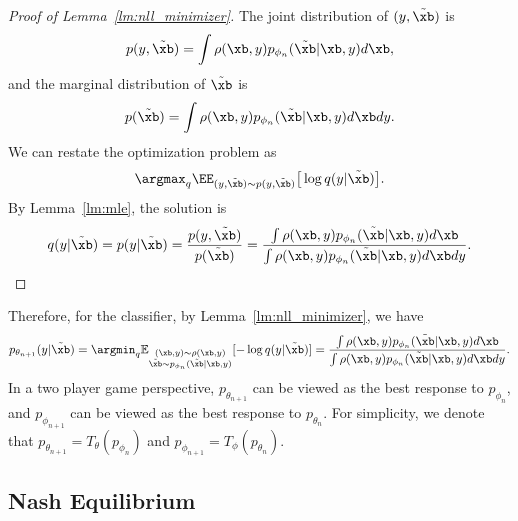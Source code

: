 \begin{proof}[Proof of Lemma~\ref{lm:nll_minimizer}]
    The joint distribution of $(y,\tilde{\xb})$ is 
    \begin{align*}
        p(y,\tilde{\xb}) = \int \rho(\xb, y)  p_{\phi_n}(\tilde{\xb} | \xb, y) d\xb,
    \end{align*}
    and the marginal distribution of $\tilde \xb$ is
    \begin{align*}
        p(\tilde{\xb}) = \int \rho(\xb,y)  p_{\phi_n}(\tilde{\xb} | \xb, y) d\xb dy.
    \end{align*}
    We can restate the optimization problem as 
    \begin{align*}
        \argmax_{q} \EE_{(y,\tilde{\xb}) \sim p(y,\tilde{\xb})}  \big[\log q (y|\tilde{\xb}) \big].
    \end{align*} 
    By Lemma~\ref{lm:mle}, the solution is 
    \begin{align*}
        \begin{aligned}
            q (y|\tilde{\xb}) 
            = p(y | \tilde{\xb})
            = \frac{p(y , \tilde{\xb})}{p(\tilde{\xb})}
            = \frac{\int \rho(\xb, y)  p_{\phi_n}(\tilde{\xb} | \xb, y) d\xb}{\int \rho(\xb,y)  p_{\phi_n}(\tilde{\xb} | \xb, y) d\xb dy}.
        \end{aligned}
    \end{align*}
\end{proof}
Therefore, for the classifier, by Lemma~\ref{lm:nll_minimizer}, we have
\begin{align*}
    p_{\theta_{n+1}}(y | \tilde{\xb}) = \argmin_{q}   \mathbb{E}_{\substack{(\xb,y) \sim \rho(\xb,y) \\ \tilde{\xb} \sim p_{\phi_n}(\tilde{\xb} | \xb,y)}} [-\log q (y|\tilde{\xb})] = \frac{\int \rho(\xb, y)  p_{\phi_n}(\tilde{\xb} | \xb, y) d\xb}{\int \rho(\xb,y)  p_{\phi_n}(\tilde{\xb} | \xb, y) d\xb dy}.
\end{align*}
In a two player game perspective, $p_{\theta_{n+1}}$ can be viewed as the best response to $p_{\phi_{n}}$, and $p_{\phi_{n+1}}$ can be viewed as the best response to $p_{\theta_{n}}$.  For simplicity, we denote that $p_{\theta_{n+1}}= T_{\theta}(p_{\phi_n})$ and $p_{\phi_{n+1}}= T_{\phi}(p_{\theta_n})$.

\subsection{Nash Equilibrium}
